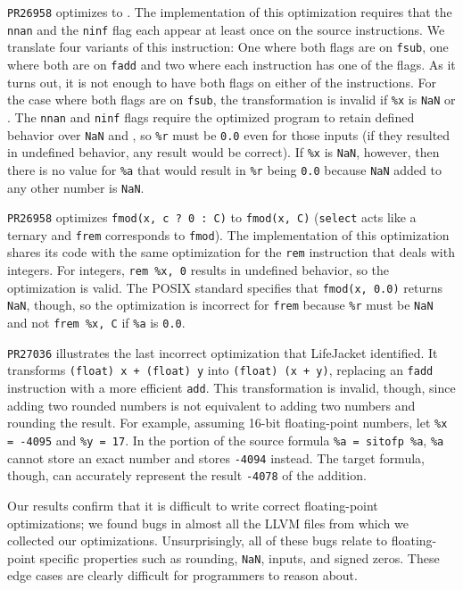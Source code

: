 \documentclass[preprint, numbers]{sigplanconf}
\newcommand{\xxx}{LifeJacket}
\begin{document}
\texttt{PR26958} optimizes  to . The implementation of this
optimization requires that the \texttt{nnan} and the \texttt{ninf} flag each
appear at least once on the source instructions. We translate four variants of
this instruction: One where both flags are on \texttt{fsub}, one where both are
on \texttt{fadd} and two where each instruction has one of the flags.  As it
turns out, it is not enough to have both flags on either of the instructions.
For the case where both flags are on \texttt{fsub}, the transformation is
invalid if \texttt{\%x} is \texttt{NaN} or . The \texttt{nnan} and
\texttt{ninf} flags require the optimized program to retain defined behavior
over \texttt{NaN} and , so \texttt{\%r} must be \texttt{0.0} even
for those inputs (if they resulted in undefined behavior, any result would be
correct). If \texttt{\%x} is \texttt{NaN}, however, then there is no value for
\texttt{\%a} that would result in \texttt{\%r} being \texttt{0.0} because
\texttt{NaN} added to any other number is \texttt{NaN}.

\texttt{PR26958} optimizes \texttt{fmod(x, c ? 0 : C)} to \texttt{fmod(x, C)}
(\texttt{select} acts like a ternary and \texttt{frem} corresponds to
\texttt{fmod}). The implementation of this optimization shares its code with
the same optimization for the \texttt{rem} instruction that deals with
integers. For integers, \texttt{rem \%x, 0} results in undefined behavior, so
the optimization is valid.  The POSIX standard specifies that \texttt{fmod(x,
0.0)} returns \texttt{NaN}, though, so the optimization is incorrect for
\texttt{frem} because \texttt{\%r} must be \texttt{NaN} and not \texttt{frem
\%x, C} if \texttt{\%a} is \texttt{0.0}.

\texttt{PR27036} illustrates the last incorrect optimization that \xxx{}
identified.  It transforms \texttt{(float) x + (float) y} into \texttt{(float)
(x + y)}, replacing an \texttt{fadd} instruction with a more efficient
\texttt{add}.  This transformation is invalid, though, since adding two rounded
numbers is not equivalent to adding two numbers and rounding the result. For
example, assuming 16-bit floating-point numbers, let \texttt{\%x = -4095} and
\texttt{\%y = 17}. In the portion of the source formula \texttt{\%a = sitofp
\%a}, \texttt{\%a} cannot store an exact number and stores \texttt{-4094}
instead.  The target formula, though, can accurately represent the result
\texttt{-4078} of the addition.

Our results confirm that it is difficult to write correct floating-point
optimizations; we found bugs in almost all the LLVM files from which we
collected our optimizations. Unsurprisingly, all of these bugs relate to
floating-point specific properties such as rounding, \texttt{NaN}, 
inputs, and signed zeros. These edge cases are clearly difficult for
programmers to reason about.
\end{document}
